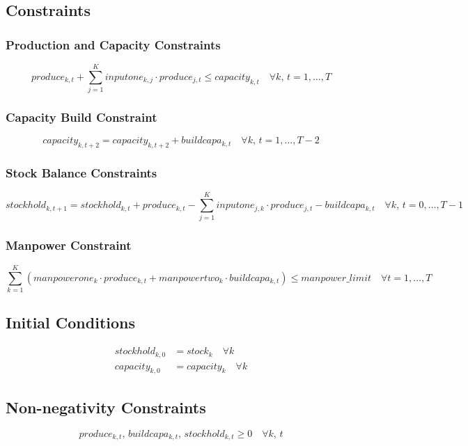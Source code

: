 \documentclass{article}
\begin{document}
\subsection*{Constraints}

\subsubsection*{Production and Capacity Constraints}
\[
produce_{k,t} + \sum_{j=1}^{K} inputone_{k,j} \cdot produce_{j,t} \leq capacity_{k,t} \quad \forall k, \, t = 1, \ldots, T
\]

\subsubsection*{Capacity Build Constraint}
\[
capacity_{k,t+2} = capacity_{k,t+2} + buildcapa_{k,t} \quad \forall k, \, t = 1, \ldots, T-2
\]

\subsubsection*{Stock Balance Constraints}
\[
stockhold_{k,t+1} = stockhold_{k,t} + produce_{k,t} - \sum_{j=1}^{K} inputone_{j,k} \cdot produce_{j,t} - buildcapa_{k,t} \quad \forall k, \, t = 0, \ldots, T-1
\]

\subsubsection*{Manpower Constraint}
\[
\sum_{k=1}^{K} \left( manpowerone_{k} \cdot produce_{k,t} + manpowertwo_{k} \cdot buildcapa_{k,t} \right) \leq manpower\_limit \quad \forall t = 1, \ldots, T
\]

\subsection*{Initial Conditions}
\begin{align*}
stockhold_{k,0} &= stock_{k} \quad \forall k \\
capacity_{k,0} &= capacity_{k} \quad \forall k
\end{align*}

\subsection*{Non-negativity Constraints}
\[
produce_{k,t}, \, buildcapa_{k,t}, \, stockhold_{k,t} \geq 0 \quad \forall k, \, t
\]
\end{document}
